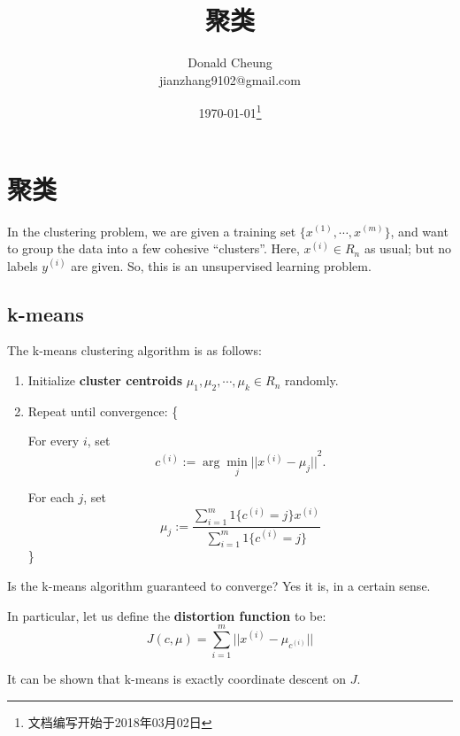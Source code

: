 \ifx\mlbook\undefined
    \providecommand{\pathroot}{../..}

    \title{聚类}
    \author{Donald Cheung\\jianzhang9102@gmail.com}
    \date{\today\footnote{文档编写开始于2018年03月02日}}

    
\fi

\chapter{聚类}
In the clustering problem, we are given a training set $\{x^{(1)}, \cdots, x^{(m)}\}$,
and want to group the data into a few cohesive ``clusters''.
Here, $x^{(i)} \in R_n$ as usual; but no labels $y^{(i)}$ are given.
So, this is an unsupervised learning problem.

\section{k-means}
The k-means clustering algorithm is as follows:
\begin{enumerate}
    \item Initialize \textbf{cluster centroids} $\mu_1, \mu_2, \cdots, \mu_k \in R_n$ randomly.
    \item Repeat until convergence: \{

            \qquad For every $i$, set
            \[
                c^{(i)} := \arg\min\limits_{j}{||x^{(i)} - \mu_j||}^2.
            \]

            \qquad For each $j$, set
            \[
                \mu_j := \frac{\sum_{i=1}^{m}{ 1\{c^{(i)}=j\}x^{(i)} }} {\sum_{i=1}^{m}{ 1\{c^{(i)}=j\} }}
            \]
        \}
\end{enumerate}

Is the k-means algorithm guaranteed to converge? Yes it is, in a certain sense.

In particular, let us define the \textbf{distortion function} to be:
\[
    J(c, \mu) = \sum_{i=1}^{m}{||x^{(i)} - \mu_{c^{(i)}}||}
\]

It can be shown that k-means is exactly coordinate descent on $J$.


\ifx\mlbook\undefined
    
\fi
